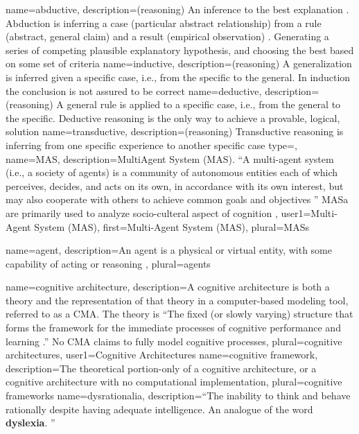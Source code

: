 {
  name=abductive,
  description={(reasoning) An inference to the best explanation \citep{henson2012semantic}. Abduction is inferring a case (particular abstract relationship) from a rule (abstract, general claim) and a result (empirical observation) \citep{shanahan1996robotics}.
  Generating a series of competing plausible explanatory hypothesis, and choosing the best based on some set of criteria \citep{henson2012semantic}}
}
{
  name=inductive,
  description={(reasoning) A generalization is inferred given a specific case, i.e., from the specific to the general.
In induction the conclusion is not assured to be correct \citep{svennevig2001abduction}}
}
{
  name=deductive,
  description={(reasoning) A general rule is applied to a specific case, i.e., from the general to the specific.
Deductive reasoning is the only way to achieve a provable, logical, solution \citep{svennevig2001abduction}}
}
{
  name=transductive,
  description={(reasoning) Transductive reasoning is inferring from one specific experience to another specific case \citep{vapnik2006empirical}}
}
{
  type=\acronymtype,
  name=MAS,
  description={Multi\-Agent System (MAS). ``A multi-agent system (i.e., a society of \glspl{agent}) is a community of autonomous entities each of which perceives, decides, and acts on its own, in accordance with its own interest, but may also cooperate with others to achieve common goals and objectives \citep{sun2006cognition}'' MASa are primarily used to analyze socio-culteral aspect of cognition \citep{butt2013soar}},
  user1={Multi-Agent System (MAS)},
  first={Multi-Agent System (MAS)},
  plural={MASs}
}

{
  name=agent,
  description={An agent is a physical or virtual entity, with some capability of acting or reasoning \citep{ferber1999multi}},
  plural={agents}
}

{
  name=cognitive architecture,
  description={A cognitive architecture is both a theory and the representation of that theory in a computer-based modeling tool, referred to as a \gls{CMA}. The theory is ``The fixed (or slowly varying) structure that forms the framework for the immediate processes of cognitive performance and learning \citep{newell1990unified}.'' No \gls{CMA} claims to fully model cognitive processes},
  plural=cognitive architectures,
  user1={Cognitive Architectures}
}
{
  name=cognitive framework,
  description={The theoretical portion-only of a cognitive architecture, or a cognitive architecture with no computational implementation},
  plural=cognitive frameworks
}
{
  name=dysrationalia,
  description={``The inability to think and behave rationally despite having adequate intelligence. An analogue of the word \textbf{dyslexia}.  \citep{Stanovich2009IntTest}''}
}

